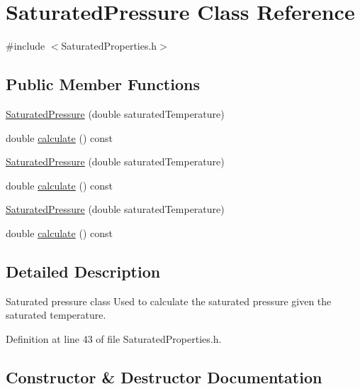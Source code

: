 \hypertarget{class_saturated_pressure}{}\section{Saturated\+Pressure Class Reference}
\label{class_saturated_pressure}


{\ttfamily \#include $<$Saturated\+Properties.\+h$>$}

\subsection*{Public Member Functions}
\begin{DoxyCompactItemize}
\item 
\hyperlink{class_saturated_pressure_a67020b0bb7588c643e12e256fa25e0bc}{Saturated\+Pressure} (double saturated\+Temperature)
\item 
double \hyperlink{class_saturated_pressure_a8ef5357b4f8af1aeaa8dde6ae05b9daa}{calculate} () const
\item 
\hyperlink{class_saturated_pressure_a67020b0bb7588c643e12e256fa25e0bc}{Saturated\+Pressure} (double saturated\+Temperature)
\item 
double \hyperlink{class_saturated_pressure_a8ef5357b4f8af1aeaa8dde6ae05b9daa}{calculate} () const
\item 
\hyperlink{class_saturated_pressure_a67020b0bb7588c643e12e256fa25e0bc}{Saturated\+Pressure} (double saturated\+Temperature)
\item 
double \hyperlink{class_saturated_pressure_a8ef5357b4f8af1aeaa8dde6ae05b9daa}{calculate} () const
\end{DoxyCompactItemize}


\subsection{Detailed Description}
Saturated pressure class Used to calculate the saturated pressure given the saturated temperature. 

Definition at line 43 of file Saturated\+Properties.\+h.



\subsection{Constructor \& Destructor Documentation}
\mbox{\label{class_saturated_pressure_a67020b0bb7588c643e12e256fa25e0bc}} 
